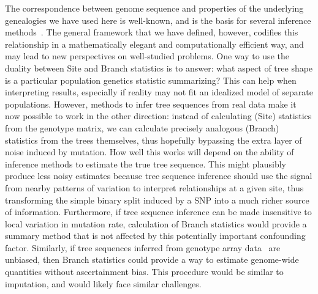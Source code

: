 \documentclass{article}
\begin{document}
The correspondence between genome sequence and properties of the
underlying genealogies we have used here is well-known,
and is the basis for several inference methods~\citep{becquet2007new,beeravolu2018able}.
The general framework
that we have defined, however, codifies this relationship in a
mathematically elegant and computationally efficient way, and may lead to
new perspectives on well-studied problems.
One way to use the duality between Site and Branch statistics is to answer:
what aspect of tree shape is a particular population genetics statistic summarizing?
This can help when interpreting results, especially if reality may not fit an idealized model
of separate populations.
However, methods to infer tree sequences from real data
make it now possible to work in the other direction:
instead of calculating (Site) statistics from the genotype matrix,
we can calculate precisely analogous (Branch) statistics from the trees themselves,
thus hopefully bypassing the extra layer of noise induced by mutation.
How well this works will depend on the ability of inference methods
to estimate the true tree sequence.
This might plausibly produce less noisy estimates because tree sequence inference
should use the signal from nearby patterns of variation
to interpret relationships at a given site,
thus transforming the simple binary split induced by a SNP
into a much richer source of information.
Furthermore,
if tree sequence inference can be made insensitive to local variation in mutation rate,
calculation of Branch statistics would provide a summary method
that is not affected by this potentially important confounding factor.
Similarly, if tree sequences inferred from
genotype array data~\citep{kelleher2019inferring} are unbiased,
then Branch statistics could provide a way
to estimate genome-wide quantities without ascertainment bias.
This procedure would be similar to imputation, and would likely face similar challenges.

\end{document}
